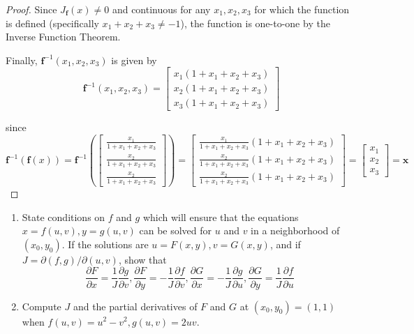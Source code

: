 \documentclass[12pt]{article}
\newcommand{\bvec}[1]{\textbf{#1}}
\newenvironment{problem}[2][Problem]{\begin{trivlist}
\item[\hskip \labelsep {\bfseries #1}\hskip \labelsep {\bfseries #2.}]}{\end{trivlist}}
\begin{document}
\begin{proof}
Since $J_{\bvec{f}}(x)\not=0$ and continuous for any $x_1,x_2,x_3$ for which the function is defined (specifically $x_1+x_2+x_3\not=-1$), the function is one-to-one by the Inverse Function Theorem.

Finally, $\bvec{f}^{-1}(x_1,x_2,x_3)$ is given by
\[
\bvec{f}^{-1}(x_1,x_2,x_3)=\begin{bmatrix}
x_1(1+x_1+x_2+x_3)\\
x_2(1+x_1+x_2+x_3)\\
x_3(1+x_1+x_2+x_3)
\end{bmatrix}
\]

since \[
\bvec{f}^{-1}(\bvec{f}(x))=\bvec{f}^{-1}\left(\begin{bmatrix}
\frac{x_1}{1+x_1+x_2+x_3} \\
\frac{x_2}{1+x_1+x_2+x_3} \\
\frac{x_2}{1+x_1+x_2+x_3}
\end{bmatrix}\right)=
\begin{bmatrix}
\frac{x_1}{1+x_1+x_2+x_3}(1+x_1+x_2+x_3) \\
\frac{x_2}{1+x_1+x_2+x_3}(1+x_1+x_2+x_3) \\
\frac{x_2}{1+x_1+x_2+x_3}(1+x_1+x_2+x_3)
\end{bmatrix}=
\begin{bmatrix}
x_1 \\x_2\\x_3
\end{bmatrix}
=\bvec{x}
\]
\end{proof}

\begin{problem}{Apos. 13.5}
\begin{enumerate}
    \item State conditions on $f$ and $g$ which will ensure that the equations $x=f(u,v), y=g(u,v)$ can be solved for $u$ and $v$ in a neighborhood of $(x_0,y_0)$. If the solutions are $u=F(x,y), v=G(x,y)$, and if $J=\partial(f,g)/\partial(u,v)$, show that
    \[
    \frac{\partial F}{\partial x}=\frac{1}{J}\frac{\partial g}{\partial v},\frac{\partial F}{\partial y}=-\frac{1}{J}\frac{\partial f}{\partial v},    \frac{\partial G}{\partial x}=-\frac{1}{J}\frac{\partial g}{\partial u},    \frac{\partial G}{\partial y}=\frac{1}{J}\frac{\partial f}{\partial u}
    \]
    \item Compute $J$ and the partial derivatives of $F$ and $G$ at $(x_0,y_0)=(1,1)$ when $f(u,v)=u^2-v^2,g(u,v)=2uv$.
\end{enumerate}
\end{problem}
\end{document}
